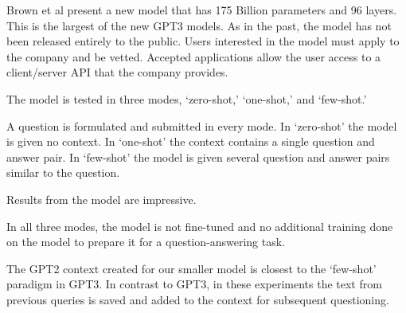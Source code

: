Brown et al \cite{brown2020language} present a new model that has 175 Billion parameters and 96 layers. This is the largest of the new GPT3 models. As in the past, the model has not been released entirely to the public. Users interested in the model must apply to the company and be vetted. Accepted applications allow the user access to a client/server API that the company provides.

The model is tested in three modes, `zero-shot,' `one-shot,' and `few-shot.' 

A question is formulated and submitted in every mode. In `zero-shot' the model is given no  context. In `one-shot' the context contains a single question and answer pair. In `few-shot' the model is given several question and answer pairs similar to the question.

Results from the model are impressive. 

In all three modes, the model is not fine-tuned and no additional training done on the model to prepare it for a question-answering task.

The GPT2 context created for our smaller model is closest to the `few-shot' paradigm in GPT3. In contrast to GPT3, in these experiments the text from previous queries is saved and added to the context for subsequent questioning.

